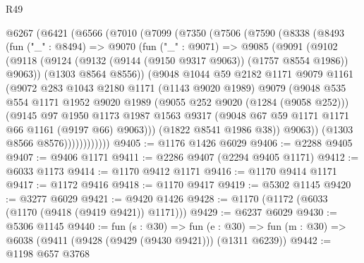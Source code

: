 \begin{lexlean}{R49}
\begin{coremodule}
  @6267
    (@6421
      (@6566
        (@7010
          (@7099
            (@7350
              (@7506
                (@7590
                  (@8338
                    (@8493
                      (fun ("_" : @8494) =>
                      @9070
                        (fun ("_" : @9071) =>
                        @9085
                          (@9091
                            (@9102
                              (@9118
                                (@9124
                                  (@9132 (@9144 (@9150 @9317 @9063)) (@1757 @8554 @1986))
                                  @9063))
                              (@1303 @8564 @8556))
                            (@9048
                              @1044
                              @59
                              @2182
                              @1171
                              @9079
                              @1161
                              (@9072
                                @283
                                @1043
                                @2180
                                @1171
                                (@1143 @9020 @1989)
                                @9079
                                (@9048
                                  @535
                                  @554
                                  @1171
                                  @1952
                                  @9020
                                  @1989
                                  (@9055 @252 @9020 (@1284 (@9058 @252)))
                                  (@9145
                                    @97
                                    @1950
                                    @1173
                                    @1987
                                    @1563
                                    @9317
                                    (@9048 @67 @59 @1171 @1171 @66 @1161 (@9197 @66) @9063)))
                                (@1822 @8541 @1986 @38))
                              @9063))
                          (@1303 @8566 @8576))))))))))))
@9405 := @1176 @1426 @6029
@9406 := @2288 @9405
@9407 := @9406 @1171
@9411 := @2286 @9407 (@2294 @9405 @1171)
@9412 := @6033 @1173
@9414 := @1170 @9412 @1171
@9416 := @1170 @9414 @1171
@9417 := @1172 @9416
@9418 := @1170 @9417
@9419 := @5302 @1145
@9420 := @3277 @6029
@9421 := @9420 @1426
@9428 := @1170 (@1172 (@6033 (@1170 (@9418 (@9419 @9421)) @1171)))
@9429 := @6237 @6029
@9430 := @5306 @1145
@9440 := fun (s : @30) =>
  fun (e : @30) => fun (m : @30) => @6038 (@9411 (@9428 (@9429 (@9430 @9421))) (@1311 @6239))
@9442 := @1198 @657 @3768

\end{coremodule}
\end{lexlean}
